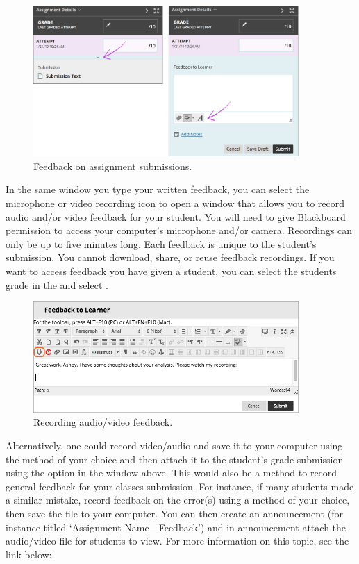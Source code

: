	\begin{figure}[!ht]
	\centering
	\includegraphics[width=0.9\textwidth]{sections/blackboard/images/orig_instr_open_editor_in_sidebar_0}
	\caption{Feedback on assignment submissions.}
	\end{figure}

In the same window you type your written feedback, you can select the microphone or video recording icon to open a window that allows you to record audio and/or video feedback for your student. You will need to give Blackboard permission to access your computer's microphone and/or camera. Recordings can only be up to five minutes long. Each feedback is unique to the student's submission. You cannot download, share, or reuse feedback recordings. If you want to access feedback you have given a student, you can select the students grade in the  and select . 

	\begin{figure}[!ht]
	\centering
	\includegraphics[width=0.9\textwidth]{sections/blackboard/images/original_instructor_feedback_editor}
	\caption{Recording audio/video feedback.}
	\end{figure}
	
Alternatively, one could record video/audio and save it to your computer using the method of your choice and then attach it to the student's grade submission using the option in the window above. This would also be a method to record general feedback for your classes submission. For instance, if many students made a similar mistake, record feedback on the error(s) using a method of your choice, then save the file to your computer. You can then create an announcement (for instance titled `Assignment Name---Feedback') and in announcement attach the audio/video file for students to view. For more information on this topic, see the link below:

